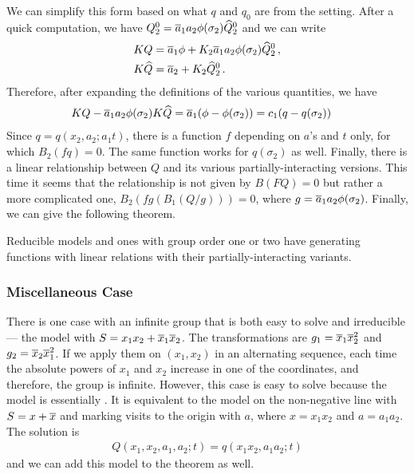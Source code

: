 We can simplify this form based on what $q$ and $q_0$ are from the \oneD setting. After a quick computation, we have $Q_2^0 = \overline{a}_1 a_2 \phi(\sigma_2) \widehat Q_2^0$ and we can write
\begin{align}
	KQ &= \overline{a}_1 \phi + K_2\overline{a}_1 a_2 \phi(\sigma_2)\widehat Q_2^0\,,\\
	K\widehat Q &= \overline{a}_2 + K_2\widehat Q_2^0\,.	
\end{align}
Therefore, after expanding the definitions of the various quantities, we have
\begin{align}
	KQ - \overline{a}_1 a_2 \phi(\sigma_2)K\widehat Q &= \overline{a}_1 (\phi - \phi(\sigma_2)) = c_1 (q-q(\sigma_2))
\end{align}
Since $q = q(x_2,a_2;a_1t)$, there is a function $f$ depending on $a$'s and $t$ only, for which $B_2(fq) = 0$. The same function works for $q(\sigma_2)$ as well. Finally, there is a linear relationship between $Q$ and its various partially-interacting versions. This time it seems that the relationship is not given by $B(F Q) = 0$ but rather a more complicated one, $B_2(fg(B_1(Q/g))) = 0$, where $g = \overline{a}_1 a_2 \phi(\sigma_2)$. Finally, we can give the following theorem.

\begin{thm} Reducible \classic \twoD models and ones with group order one or two have generating functions with linear relations with their partially-interacting variants.
\end{thm}

\subsubsection{Miscellaneous Case}

There is one case with an infinite group that is both easy to solve and irreducible --- the model with $S = x_1x_2 + \overline{x}_1 \overline{x}_2$. The transformations are $g_1= \overline{x}_1 \overline{x}_2^2$ and $g_2= \overline{x}_2 \overline{x}_1^2$. If we apply them on $(x_1,x_2)$ in an alternating sequence, each time the absolute powers of $x_1$ and $x_2$ increase in one of the coordinates, and therefore, the group is infinite. However, this case is easy to solve because the model is essentially \oneD. It is equivalent to the model on the non-negative line with $S = x + \overline{x}$ and marking visits to the origin with $a$, where $x = x_1 x_2$ and $a = a_1 a_2$. The solution is
\begin{align}
	Q(x_1,x_2,a_1,a_2;t) = q(x_1x_2,a_1a_2;t)
\end{align}
and we can add this model to the theorem as well.

